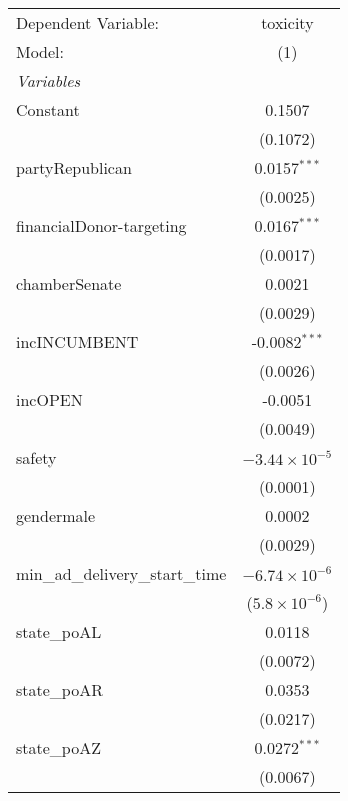 \begingroup
\centering
\begin{tabular}{lc}
   \tabularnewline \midrule \midrule
   Dependent Variable:                & toxicity\\  
   Model:                             & (1)\\  
   \midrule
   \emph{Variables}\\
   Constant                           & 0.1507\\   
                                      & (0.1072)\\   
   partyRepublican                    & 0.0157$^{***}$\\   
                                      & (0.0025)\\   
   financialDonor-targeting           & 0.0167$^{***}$\\   
                                      & (0.0017)\\   
   chamberSenate                      & 0.0021\\   
                                      & (0.0029)\\   
   incINCUMBENT                       & -0.0082$^{***}$\\   
                                      & (0.0026)\\   
   incOPEN                            & -0.0051\\   
                                      & (0.0049)\\   
   safety                             & $-3.44\times 10^{-5}$\\    
                                      & (0.0001)\\   
   gendermale                         & 0.0002\\   
                                      & (0.0029)\\   
   min\_ad\_delivery\_start\_time     & $-6.74\times 10^{-6}$\\    
                                      & ($5.8\times 10^{-6}$)\\    
   state\_poAL                        & 0.0118\\   
                                      & (0.0072)\\   
   state\_poAR                        & 0.0353\\   
                                      & (0.0217)\\   
   state\_poAZ                        & 0.0272$^{***}$\\   
                                      & (0.0067)\\   

\end{tabular}
